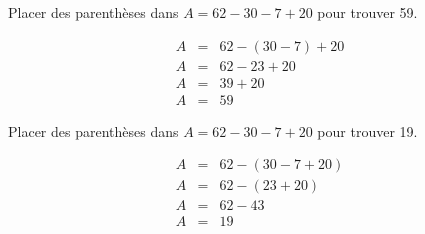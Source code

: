 \begin{questions}
	\question[1] Placer des parenthèses dans $A = 62 - 30 - 7 + 20$ pour trouver 59.
	\begin{solution}
		\begin{eqnarray*}
			A &=& 62 - (30 - 7) + 20 \\
			A &=& 62 - 23 + 20 \\
			A &=& 39 + 20 \\
			A &=& 59
		\end{eqnarray*}
	\end{solution}
	
	\question[1] Placer des parenthèses dans $A = 62 - 30 - 7 + 20$ pour trouver 19.
	\begin{solution}
		\begin{eqnarray*}
			A &=& 62 - (30 - 7 + 20) \\
			A &=& 62 - (23 + 20) \\
			A &=& 62 - 43\\
			A &=& 19
		\end{eqnarray*}
	\end{solution}
\end{questions}
